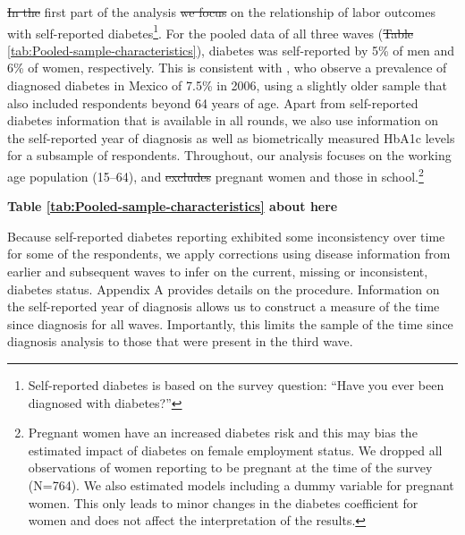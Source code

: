 \documentclass[12pt,english]{article}
\providecommand{\DIFaddtex}[1]{{\protect\color{blue}\uwave{#1}}} %
\providecommand{\DIFdeltex}[1]{{\protect\color{red}\sout{#1}}}                      %
\providecommand{\DIFaddbegin}{} %
\providecommand{\DIFaddend}{} %
\providecommand{\DIFdelbegin}{} %
\providecommand{\DIFdelend}{} %
\providecommand{\DIFadd}[1]{\texorpdfstring{\DIFaddtex{#1}}{#1}} %
\providecommand{\DIFdel}[1]{\texorpdfstring{\DIFdeltex{#1}}{}} %
\begin{document}
\DIFdelbegin \DIFdel{In the }\DIFdelend \DIFaddbegin \DIFadd{The }\DIFaddend first part of the analysis \DIFdelbegin \DIFdel{we focus }\DIFdelend \DIFaddbegin \DIFadd{focuses }\DIFaddend on the relationship of labor outcomes with self-reported diabetes\footnote{Self-reported diabetes is based on the survey question: “Have you ever been diagnosed with diabetes?”}. For the pooled data of all three waves (\DIFdelbegin \DIFdel{Table }\DIFdelend \DIFaddbegin \DIFadd{table }\DIFaddend \ref{tab:Pooled-sample-characteristics}), diabetes was self-reported by 5\% of men and 6\% of women, respectively. This is consistent with \textcite{Barquera2013}, who observe a prevalence of diagnosed diabetes in Mexico of 7.5\% in 2006, using a slightly older sample that also included respondents beyond 64 years of age. Apart from self-reported diabetes information that is available in all rounds, we also use information on the self-reported year of diagnosis as well as biometrically measured \ac{HbA1c} levels for a subsample of respondents. Throughout, our analysis focuses on the working age population (15–64), and \DIFdelbegin \DIFdel{excludes }\DIFdelend \DIFaddbegin \DIFadd{exclude }\DIFaddend pregnant women and those in school.\footnote{Pregnant women have an increased diabetes risk and this may bias the estimated impact of diabetes on female employment status. We dropped all observations of women reporting to be pregnant at the time of the survey (N=764). We also estimated models including a dummy variable for pregnant women. This only leads to minor changes in the diabetes coefficient for women and does not affect the interpretation of the results.}

\begin{center}
	\textbf{Table \ref{tab:Pooled-sample-characteristics} about here}
\end{center}

Because self-reported diabetes reporting exhibited some inconsistency over time for some of the respondents, we apply corrections using disease information from earlier and subsequent waves to infer on the current, missing or inconsistent, diabetes status. Appendix A provides details on the procedure. Information on the self-reported year of diagnosis allows us to construct a measure of the time since diagnosis for all waves. Importantly, this limits the sample of the time since diagnosis analysis to those that were present in the third wave. 
\end{document}
